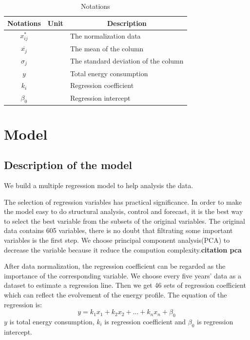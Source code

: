 \documentclass[]{article}
\title{}
\author{}
\begin{document}
\maketitle

\begin{table}[htb]\renewcommand{\arraystretch}{1.4}
	\centering
	\caption{Notations}
	\label{notations}
	\begin{tabular}{c c l}
		\hline
		Notations           & Unit                & \multicolumn{1}{c}{Description}              \\ \hline
		 $x_{ij}^{*}$  & \ & The normalization data \\
		 $\overline{x_{j}}$ &\ & The mean of the column\\
		 $\sigma_{j}$ &\ &The standard deviation of the column\\
		 $y$  &\ & Total energy consumption\\
		 $k_{i}$  &\ &Regression coefficient\\
		 $\beta_{0}$  &\ & Regression intercept\\ \hline
	\end{tabular}
\end{table}

\section{Model }
\subsection{Description of the model}


We build a multiple regression model to help analysis the data.


The selection of regression variables has practical significance.  In order to make the model easy to do structural analysis,  control and forecast,  it is the best way to select the best variable from the subsets of the original variables.  The original data contains 605 variables,  there is no doubt that filtrating some important variables is the first step.  We choose principal component analysis(PCA) to decrease the variable because it reduce the compution complexity.\textbf{citation pca}


After data normalization,  the regression coefficient can be regarded as the importance of the corresponding variable.  We choose every five years' data as a dataset to estimate a regression line.  Then we get 46 sets  of  regression coefficient which can reflect the evolvement of the energy profile.  The equation of the regression is:
\begin{equation}
y = k_{1}x_{1}+ k_{2}x_{2}+...+k_{n}x_{n}+\beta_{0}
\end{equation}
$y$  is total energy consumption, $k_{i}$  is regression coefficient and $\beta_{0}$  is regression intercept.
\end{document}
